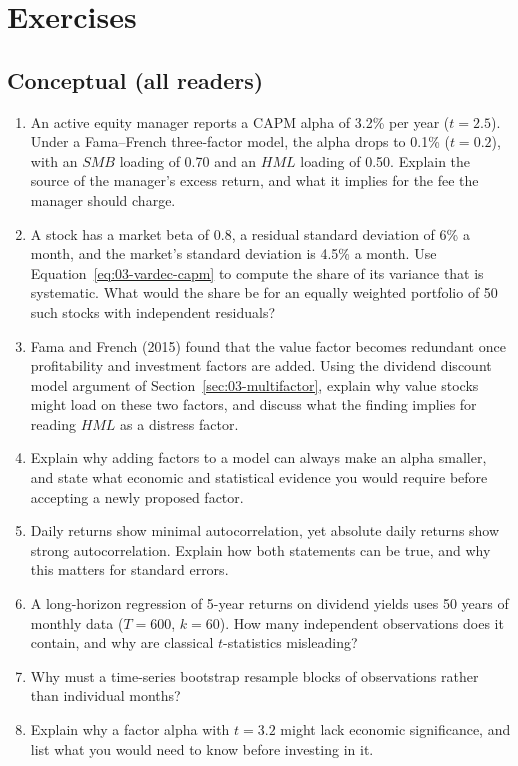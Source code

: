 \section*{Exercises}

\subsection*{Conceptual (all readers)}
\begin{enumerate}
  \item An active equity manager reports a CAPM alpha of 3.2\% per year ($t = 2.5$). Under a Fama--French three-factor model, the alpha drops to 0.1\% ($t = 0.2$), with an $SMB$ loading of 0.70 and an $HML$ loading of 0.50. Explain the source of the manager's excess return, and what it implies for the fee the manager should charge.
  \item A stock has a market beta of 0.8, a residual standard deviation of 6\% a month, and the market's standard deviation is 4.5\% a month. Use Equation~\eqref{eq:03-vardec-capm} to compute the share of its variance that is systematic. What would the share be for an equally weighted portfolio of 50 such stocks with independent residuals?
  \item Fama and French (2015) found that the value factor becomes redundant once profitability and investment factors are added. Using the dividend discount model argument of Section~\ref{sec:03-multifactor}, explain why value stocks might load on these two factors, and discuss what the finding implies for reading $HML$ as a distress factor.
  \item Explain why adding factors to a model can always make an alpha smaller, and state what economic and statistical evidence you would require before accepting a newly proposed factor.
  \item Daily returns show minimal autocorrelation, yet absolute daily returns show strong autocorrelation. Explain how both statements can be true, and why this matters for standard errors.
  \item A long-horizon regression of 5-year returns on dividend yields uses 50 years of monthly data ($T=600$, $k=60$). How many independent observations does it contain, and why are classical $t$-statistics misleading?
  \item Why must a time-series bootstrap resample blocks of observations rather than individual months?
  \item Explain why a factor alpha with $t = 3.2$ might lack economic significance, and list what you would need to know before investing in it.
\end{enumerate}

